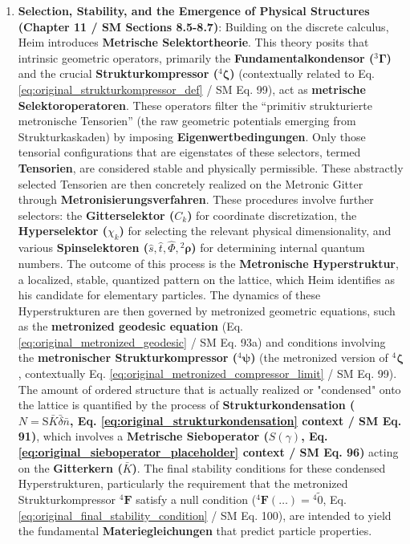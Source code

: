 \documentclass[12pt]{article}
\newcommand{\q}[1]{\enquote{#1}}
\newcommand{\fundamentalkondensor}{{}^3\bm{\Gamma}}
\newcommand{\metrischesieboperator}{S(\gamma)}
\newcommand{\strukturkompressor}{{}^4\bm{\zeta}}
\newcommand{\metronischerstrukturkompressor}{{}^4\bm{\psi}} %
\newcommand{\metronisiertekondensor}[1]{{}^{#1}\mathbf{F}} %
\begin{document}
\begin{enumerate}
    \item \textbf{Selection, Stability, and the Emergence of Physical Structures (Chapter 11 / SM Sections 8.5-8.7)}: Building on the discrete calculus, Heim introduces \textbf{Metrische Selektortheorie}. This theory posits that intrinsic geometric operators, primarily the \textbf{Fundamentalkondensor (\( \fundamentalkondensor \))} and the crucial \textbf{Strukturkompressor (\( \strukturkompressor \))} (contextually related to Eq. \eqref{eq:original_strukturkompressor_def} / SM Eq. 99), act as \textbf{metrische Selektoroperatoren}. These operators filter the \q{primitiv strukturierte metronische Tensorien} (the raw geometric potentials emerging from Strukturkaskaden) by imposing \textbf{Eigenwertbedingungen}. Only those tensorial configurations that are eigenstates of these selectors, termed \textbf{Tensorien}, are considered stable and physically permissible. These abstractly selected Tensorien are then concretely realized on the Metronic Gitter through \textbf{Metronisierungsverfahren}. These procedures involve further selectors: the \textbf{Gitterselektor (\( C_k \))} for coordinate discretization, the \textbf{Hyperselektor (\( \chi_k \))} for selecting the relevant physical dimensionality, and various \textbf{Spinselektoren (\( \hat{s}, \hat{t}, \hat{\Phi}, {}^2\bm{\rho} \))} for determining internal quantum numbers. The outcome of this process is the \textbf{Metronische Hyperstruktur}, a localized, stable, quantized pattern on the lattice, which Heim identifies as his candidate for elementary particles. The dynamics of these Hyperstrukturen are then governed by metronized geometric equations, such as the \textbf{metronized geodesic equation} (Eq. \eqref{eq:original_metronized_geodesic} / SM Eq. 93a) and conditions involving the \textbf{metronischer Strukturkompressor (\( \metronischerstrukturkompressor \))} (the metronized version of \( \strukturkompressor \), contextually Eq. \eqref{eq:original_metronized_compressor_limit} / SM Eq. 99). The amount of ordered structure that is actually realized or "condensed" onto the lattice is quantified by the process of \textbf{Strukturkondensation (\( N = \mathrm{S}\bar{K}\bar{\delta}\bar{n} \), Eq. \eqref{eq:original_strukturkondensation} context / SM Eq. 91)}, which involves a \textbf{Metrische Sieboperator (\( \metrischesieboperator \), Eq. \eqref{eq:original_sieboperator_placeholder} context / SM Eq. 96)} acting on the \textbf{Gitterkern (\( \bar{K} \))}. The final stability conditions for these condensed Hyperstrukturen, particularly the requirement that the metronized Strukturkompressor \( \metronisiertekondensor{4} \) satisfy a null condition (\( \metronisiertekondensor{4}(\dots) = {}^{4}\tilde{0} \), Eq. \eqref{eq:original_final_stability_condition} / SM Eq. 100), are intended to yield the fundamental \textbf{Materiegleichungen} that predict particle properties.


\end{enumerate}
\end{document}
